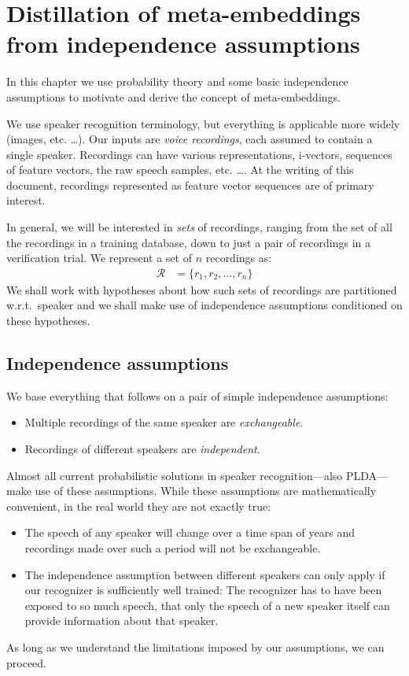 \documentclass[a4paper,oneside,12pt,english]{report}
\def\Rset{\mathcal{R}}
\begin{document}
\chapter{Distillation of meta-embeddings from independence assumptions}
\label{chap:fp}
In this chapter we use probability theory and some basic independence assumptions to motivate and derive the concept of meta-embeddings.  

We use speaker recognition terminology, but everything is applicable more widely (images, etc. \ldots). Our inputs are \emph{voice recordings}, each assumed to contain a single speaker. Recordings can have various representations, i-vectors, sequences of feature vectors, the raw speech samples, etc. \ldots. At the writing of this document, recordings represented as feature vector sequences are of primary interest.  

In general, we will be interested in \emph{sets} of recordings, ranging from the set of all the recordings in a training database, down to just a pair of recordings in a verification trial. We represent a set of $n$ recordings as:
\begin{align*}
\Rset &=\{r_1,r_2,\ldots,r_n\}
\end{align*}
We shall work with hypotheses about how such sets of recordings are partitioned w.r.t.\ speaker and we shall make use of independence assumptions conditioned on these hypotheses. 

\section{Independence assumptions}
\label{sec:IS}
We base everything that follows on a pair of simple independence assumptions: 
\begin{itemize}
	\item Multiple recordings of the same speaker are \emph{exchangeable}.
	\item Recordings of different speakers are \emph{independent}. 
\end{itemize}
Almost all current probabilistic solutions in speaker recognition---also PLDA---make use of these assumptions. While these assumptions are mathematically convenient, in the real world they are not exactly true: 
\begin{itemize}
	\item The speech of any speaker will change over a time span of years and recordings made over such a period will not be exchangeable. 
	\item The independence assumption between different speakers can only apply if our recognizer is sufficiently well trained: The recognizer has to have been exposed to so much speech, that only the speech of a new speaker itself can provide information about that speaker.
\end{itemize}
As long as we understand the limitations imposed by our assumptions, we can proceed.  \\
\end{document}
